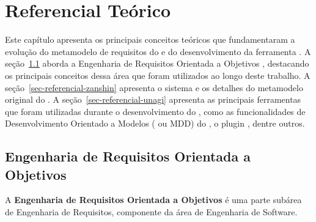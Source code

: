 % 
\chapter{Referencial Teórico}
\label{sec-referencial}

Este capítulo apresenta os principais conceitos teóricos que fundamentaram a evolução do metamodelo de requisitos do \zanshin e do desenvolvimento da ferramenta \unagi. A seção~\ref{sec-referencial-engenharia-requisitos} aborda a Engenharia de Requisitos Orientada a Objetivos , destacando os principais conceitos dessa área que foram utilizados ao longo deste trabalho. A seção~\ref{sec-referencial-zanshin} apresenta o sistema \zanshin e os detalhes do metamodelo original do . A seção~\ref{sec-referencial-unagi} apresenta as principais ferramentas que foram utilizadas durante o desenvolvimento do \unagi, como as funcionalidades de Desenvolvimento Orientado a Modelos ( ou MDD) do \eclipse, o plugin \sirius, dentre outros.



\section{Engenharia de Requisitos Orientada a Objetivos}
\label{sec-referencial-engenharia-requisitos}

A \textbf{Engenharia de Requisitos Orientada a Objetivos} é uma parte subárea de Engenharia de Requisitos, componente da área de Engenharia de Software. 

